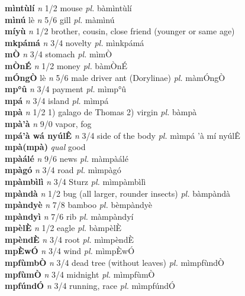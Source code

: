 \documentclass{article}
\begin{document}
{\bf mìntùlí}  {\it n} 1/2 mouse {\it pl.} bàmìntùlí         \\ 
{\bf mìnú} lè {\it n} 5/6 gill {\it pl.} màmìnú         \\ 
{\bf míyù}  {\it n} 1/2 brother, cousin, close friend (younger or same age)         \\ 
{\bf mkpámá}  {\it n} 3/4 novelty {\it pl.} mìnkpámá         \\ 
{\bf mÒ}  {\it n} 3/4 stomach {\it pl.} mìmÒ         \\ 
{\bf mÒnÉ}  {\it n} 1/2 money {\it pl.} bàmÒnÉ         \\ 
{\bf mÓngÒ} lè {\it n} 5/6 male driver ant (Dorylinae) {\it pl.} màmÓngÒ         \\ 
{\bf mp°û}  {\it n} 3/4 payment {\it pl.} mìmp°û         \\ 
{\bf mpá}  {\it n} 3/4 island {\it pl.} mìmpá         \\ 
{\bf mpà}  {\it n} 1/2 1) galago de Thomas 2) virgin {\it pl.} bàmpà         \\ 
{\bf mpà'à}  {\it n} 9/0 vapor, fog         \\ 
{\bf mpá'à wá nyúlÊ}  {\it n} 3/4 side of the body {\it pl.} mìmpá 'à mí nyúlÊ         \\ 
{\bf mpà(mpà)}  {\it qual} good         \\ 
{\bf mpàálé}  {\it n} 9/6 news {\it pl.} màmpàálé         \\ 
{\bf mpàgó}  {\it n} 3/4 road {\it pl.} mìmpàgó         \\ 
{\bf mpàmbìlì}  {\it n} 3/4 Sturz {\it pl.} mìmpàmbìlì         \\ 
{\bf mpàndà}  {\it n} 1/2 bug (all larger, rounder insects) {\it pl.} bàmpàndà         \\ 
{\bf mpàndyè}  {\it n} 7/8 bamboo {\it pl.} bèmpàndyè         \\ 
{\bf mpàndyì}  {\it n} 7/6 rib {\it pl.} màmpàndyí         \\ 
{\bf mpèlÈ}  {\it n} 1/2 eagle {\it pl.} bàmpèlÈ         \\ 
{\bf mpèndÈ}  {\it n} 3/4 root {\it pl.} mìmpèndÈ         \\ 
{\bf mpÈwÓ}  {\it n} 3/4 wind {\it pl.} mìmpÈwÓ         \\ 
{\bf mpfùmbÒ}  {\it n} 3/4 dead tree (without leaves) {\it pl.} mìmpfùndÒ         \\ 
{\bf mpfùmÒ}  {\it n} 3/4 midnight {\it pl.} mìmpfùmÒ         \\ 
{\bf mpfúndÓ}  {\it n} 3/4 running, race {\it pl.} mìmpfúndÓ         \\ 
\end{document}
